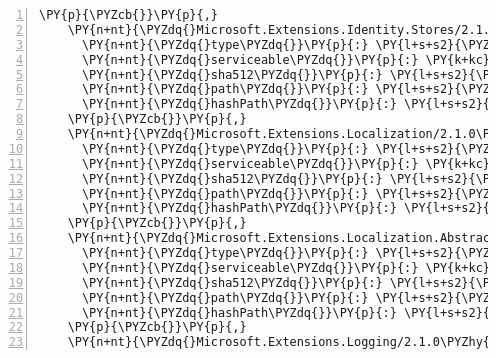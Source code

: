 \begin{Verbatim}[commandchars=\\\{\},numbers=left,firstnumber=1,stepnumber=1,numberblanklines=0]
    \PY{p}{\PYZcb{}}\PY{p}{,}
    \PY{n+nt}{\PYZdq{}Microsoft.Extensions.Identity.Stores/2.1.0\PYZhy{}rc1\PYZhy{}final\PYZdq{}}\PY{p}{:} \PY{p}{\PYZob{}}
      \PY{n+nt}{\PYZdq{}type\PYZdq{}}\PY{p}{:} \PY{l+s+s2}{\PYZdq{}package\PYZdq{}}\PY{p}{,}
      \PY{n+nt}{\PYZdq{}serviceable\PYZdq{}}\PY{p}{:} \PY{k+kc}{true}\PY{p}{,}
      \PY{n+nt}{\PYZdq{}sha512\PYZdq{}}\PY{p}{:} \PY{l+s+s2}{\PYZdq{}sha512\PYZhy{}8UuRZGgiqDcl5iF0iLecfGODF4LHQU4yBb4lo/wxgeLB7RgsqR6DFpM1c4Emw79UhMZDx0ZwGdZBKQ1Bn/PBrQ==\PYZdq{}}\PY{p}{,}
      \PY{n+nt}{\PYZdq{}path\PYZdq{}}\PY{p}{:} \PY{l+s+s2}{\PYZdq{}microsoft.extensions.identity.stores/2.1.0\PYZhy{}rc1\PYZhy{}final\PYZdq{}}\PY{p}{,}
      \PY{n+nt}{\PYZdq{}hashPath\PYZdq{}}\PY{p}{:} \PY{l+s+s2}{\PYZdq{}microsoft.extensions.identity.stores.2.1.0\PYZhy{}rc1\PYZhy{}final.nupkg.sha512\PYZdq{}}
    \PY{p}{\PYZcb{}}\PY{p}{,}
    \PY{n+nt}{\PYZdq{}Microsoft.Extensions.Localization/2.1.0\PYZhy{}rc1\PYZhy{}final\PYZdq{}}\PY{p}{:} \PY{p}{\PYZob{}}
      \PY{n+nt}{\PYZdq{}type\PYZdq{}}\PY{p}{:} \PY{l+s+s2}{\PYZdq{}package\PYZdq{}}\PY{p}{,}
      \PY{n+nt}{\PYZdq{}serviceable\PYZdq{}}\PY{p}{:} \PY{k+kc}{true}\PY{p}{,}
      \PY{n+nt}{\PYZdq{}sha512\PYZdq{}}\PY{p}{:} \PY{l+s+s2}{\PYZdq{}sha512\PYZhy{}xkLLjjq00d42SQGYYF3pfx5QVq+SgrHz/Vdg+6C4/dQinGT5w2YyzJYTf4DFsVQbV1cSbzGH0/yTJ2XYjPHoVQ==\PYZdq{}}\PY{p}{,}
      \PY{n+nt}{\PYZdq{}path\PYZdq{}}\PY{p}{:} \PY{l+s+s2}{\PYZdq{}microsoft.extensions.localization/2.1.0\PYZhy{}rc1\PYZhy{}final\PYZdq{}}\PY{p}{,}
      \PY{n+nt}{\PYZdq{}hashPath\PYZdq{}}\PY{p}{:} \PY{l+s+s2}{\PYZdq{}microsoft.extensions.localization.2.1.0\PYZhy{}rc1\PYZhy{}final.nupkg.sha512\PYZdq{}}
    \PY{p}{\PYZcb{}}\PY{p}{,}
    \PY{n+nt}{\PYZdq{}Microsoft.Extensions.Localization.Abstractions/2.1.0\PYZhy{}rc1\PYZhy{}final\PYZdq{}}\PY{p}{:} \PY{p}{\PYZob{}}
      \PY{n+nt}{\PYZdq{}type\PYZdq{}}\PY{p}{:} \PY{l+s+s2}{\PYZdq{}package\PYZdq{}}\PY{p}{,}
      \PY{n+nt}{\PYZdq{}serviceable\PYZdq{}}\PY{p}{:} \PY{k+kc}{true}\PY{p}{,}
      \PY{n+nt}{\PYZdq{}sha512\PYZdq{}}\PY{p}{:} \PY{l+s+s2}{\PYZdq{}sha512\PYZhy{}lVjab/m0mdSmch1hqmI16++9ZmfbteIuAhLQApwSb6O2f7zcS1f2VL9CSKUATvzK0nXG1mxU6ot/D2a3NPNwHw==\PYZdq{}}\PY{p}{,}
      \PY{n+nt}{\PYZdq{}path\PYZdq{}}\PY{p}{:} \PY{l+s+s2}{\PYZdq{}microsoft.extensions.localization.abstractions/2.1.0\PYZhy{}rc1\PYZhy{}final\PYZdq{}}\PY{p}{,}
      \PY{n+nt}{\PYZdq{}hashPath\PYZdq{}}\PY{p}{:} \PY{l+s+s2}{\PYZdq{}microsoft.extensions.localization.abstractions.2.1.0\PYZhy{}rc1\PYZhy{}final.nupkg.sha512\PYZdq{}}
    \PY{p}{\PYZcb{}}\PY{p}{,}
    \PY{n+nt}{\PYZdq{}Microsoft.Extensions.Logging/2.1.0\PYZhy{}rc1\PYZhy{}final\PYZdq{}}\PY{p}{:} \PY{p}{\PYZob{}}

\end{Verbatim}
